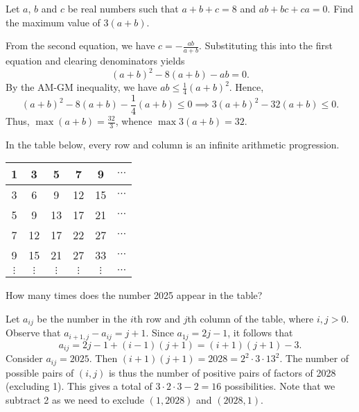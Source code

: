 \begin{question}[32]\label{Q::2024-J-1-18}
    Let $a$, $b$ and $c$ be real numbers such that $a + b + c = 8$ and $ab + bc + ca = 0$. Find the maximum value of $3(a + b)$.
\end{question}
\begin{solution*}
    From the second equation, we have $c = -\frac{ab}{a + b}$. Substituting this into the first equation and clearing denominators yields \[(a+b)^2 - 8(a+b) - ab = 0.\] By the AM-GM inequality, we have $ab \leq \frac14 (a+b)^2$. Hence, \[(a+b)^2 - 8(a+b) - \frac14(a+b) \leq 0 \implies 3(a+b)^2 - 32(a+b) \leq 0.\] Thus, $\max (a+b) = \frac{32}{3}$, whence $\max 3(a+b) = 32$.
\end{solution*}

\begin{question}[16]\label{Q::2024-J-1-19}
    In the table below, every row and column is an infinite arithmetic progression.

    \begin{table}[H]
        \centering
        \begin{tabular}{|c|c|c|c|c|c|}
        \hline
        1 & 3 & 5 & 7 & 9 & $\cdots$ \\\hline
        3 & 6 & 9 & 12 & 15 & $\cdots$ \\\hline
        5 & 9 & 13 & 17 & 21 & $\cdots$ \\\hline
        7 & 12 & 17 & 22 & 27 & $\cdots$ \\\hline
        9 & 15 & 21 & 27 & 33 & $\cdots$ \\\hline
        $\vdots$ & $\vdots$ & $\vdots$ & $\vdots$ & $\vdots$ & $\cdots$\\\hline
        \end{tabular}
    \end{table}

    How many times does the number 2025 appear in the table?
\end{question}
\begin{solution*}
    Let $a_{ij}$ be the number in the $i$th row and $j$th column of the table, where $i, j > 0$. Observe that $a_{i+1,j} - a_{ij} = j+1$. Since $a_{1j} = 2j - 1$, it follows that \[a_{ij} = 2j - 1 + (i-1)(j+1) = (i+1)(j+1) - 3.\] Consider $a_{ij} = 2025$. Then $(i + 1)(j + 1) = 2028 = 2^2 \cdot 3 \cdot 13^2$. The number of possible pairs of $(i, j)$ is thus the number of positive pairs of factors of 2028 (excluding 1). This gives a total of $3 \cdot 2 \cdot 3 - 2 = 16$ possibilities. Note that we subtract 2 as we need to exclude $(1, 2028)$ and $(2028, 1)$.
\end{solution*}

